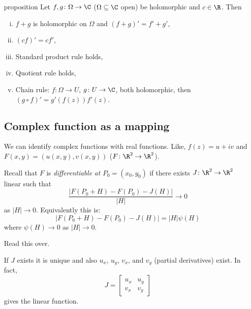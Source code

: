 \documentclass[class=article, crop=false]{standalone}
\begin{document}
\begin{result}{proposition}
  Let $f,g\colon \Omega \to \C$ ($\Omega\subseteq\C$ open) be holomorphic and $c \in \R$. Then
    \begin{enumerate}[(i)]
      \item $f+g$ is holomorphic on $\Omega$ and $(f+g)' = f'+g'$,
      \item $(cf)' = cf'$,
      \item Standard product rule holds,
      \item Quotient rule holds,
      \item Chain rule: $f\colon \Omega \to U$, $g\colon U \to \C$, both holomorphic, then $(g \circ f)' = g'(f(z)) f'(z)$.
    \end{enumerate}
\end{result}


\subsection*{Complex function as a mapping}

We can identify complex functions with real functions. Like, $f(z) = u+iv$ and $F(x,y) = (u(x,y),v(x,y))$ ($F\colon \R^2 \to \R^2$).

Recall that $F$ is \emph{differentiable at $P_0 = (x_0,y_0)$} if there exists $J \colon \R^2 \to \R^2$ linear such that
  \[
    \frac{| F(P_0+H)-F(P_0)-J(H)|}{|H|} \to 0
  \]
as $|H| \to 0$. Equivalently this is:
  \[
    |F(P_0+H)-F(P_0)-J(H)| = |H| \psi(H)
  \]
where $\psi(H) \to 0$ as $|H| \to 0$.
\begin{rem}
  Read this over.
\end{rem}
If $J$ exists it is unique and also $u_x$, $u_y$, $v_x$, and $v_y$ (partial derivatives) exist. In fact,
  \[
    J =
      \begin{bmatrix}
        u_x & u_y \\
        v_x & v_y
      \end{bmatrix}
  \]
gives the linear function.
\end{document}
